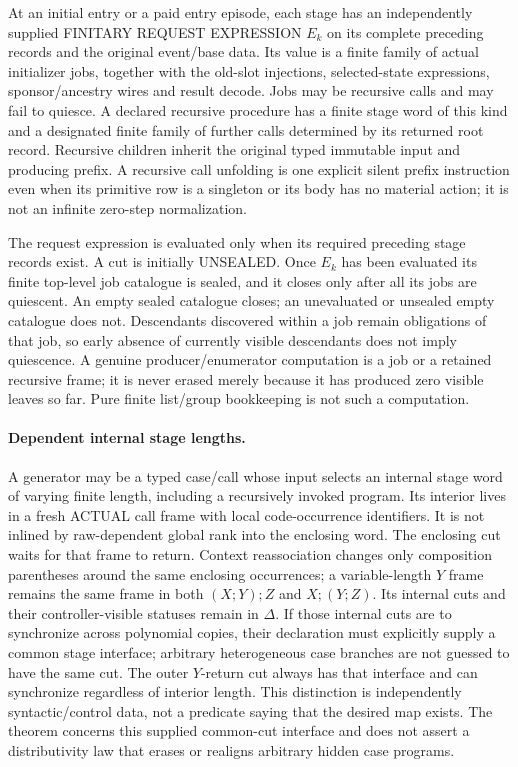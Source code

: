 \documentclass[11pt]{article}
\begin{document}
At an initial entry or a paid entry episode, each stage has an independently supplied FINITARY REQUEST EXPRESSION $E_k$ on its complete preceding records and the original event/base data. Its value is a finite family of actual initializer jobs, together with the old-slot injections, selected-state expressions, sponsor/ancestry wires and result decode. Jobs may be recursive calls and may fail to quiesce. A declared recursive procedure has a finite stage word of this kind and a designated finite family of further calls determined by its returned root record. Recursive children inherit the original typed immutable input and producing prefix. A recursive call unfolding is one explicit silent prefix instruction even when its primitive row is a singleton or its body has no material action; it is not an infinite zero-step normalization.

The request expression is evaluated only when its required preceding stage records exist. A cut is initially UNSEALED. Once $E_k$ has been evaluated its finite top-level job catalogue is sealed, and it closes only after all its jobs are quiescent. An empty sealed catalogue closes; an unevaluated or unsealed empty catalogue does not. Descendants discovered within a job remain obligations of that job, so early absence of currently visible descendants does not imply quiescence. A genuine producer/enumerator computation is a job or a retained recursive frame; it is never erased merely because it has produced zero visible leaves so far. Pure finite list/group bookkeeping is not such a computation.

\paragraph{Dependent internal stage lengths.} A generator may be a typed case/call whose input selects an internal stage word of varying finite length, including a recursively invoked program. Its interior lives in a fresh ACTUAL call frame with local code-occurrence identifiers. It is not inlined by raw-dependent global rank into the enclosing word. The enclosing cut waits for that frame to return. Context reassociation changes only composition parentheses around the same enclosing occurrences; a variable-length $Y$ frame remains the same frame in both $(X;Y);Z$ and $X;(Y;Z)$. Its internal cuts and their controller-visible statuses remain in $\Delta$. If those internal cuts are to synchronize across polynomial copies, their declaration must explicitly supply a common stage interface; arbitrary heterogeneous case branches are not guessed to have the same cut. The outer $Y$-return cut always has that interface and can synchronize regardless of interior length. This distinction is independently syntactic/control data, not a predicate saying that the desired map exists. The theorem concerns this supplied common-cut interface and does not assert a distributivity law that erases or realigns arbitrary hidden case programs.
\end{document}
